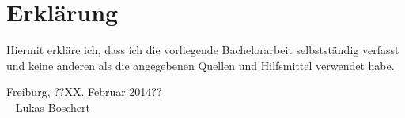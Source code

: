 \chapter*{Erkl\"arung}

Hiermit erkl\"are ich, dass ich die vorliegende Bachelorarbeit 
selbstst\"andig verfasst und keine anderen als die angegebenen
Quellen und Hilfsmittel verwendet habe. 

\bigskip
\bigskip

\noindent
Freiburg, ??XX. Februar 2014?? \hfill \underline{\hspace{5cm}} \hspace*{.5cm} \\
\mbox{ } \hfill Lukas Boschert \hspace*{2cm}